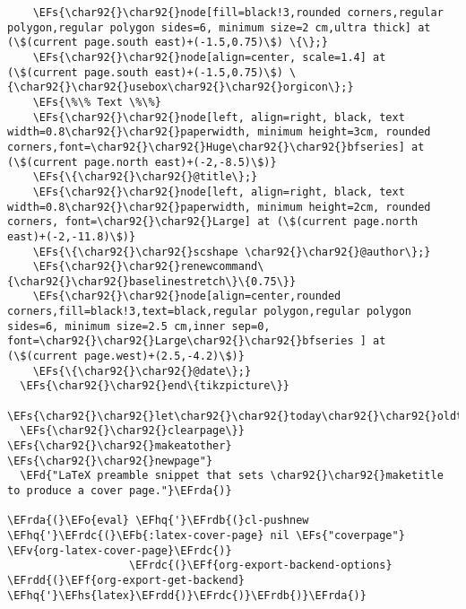 \documentclass{article}
\newcommand{\EFs}[1]{\textcolor{EFs}{#1}} %
\newcommand{\EFd}[1]{\textcolor{EFd}{#1}} %
\newcommand{\EFb}[1]{\textcolor{EFb}{#1}} %
\newcommand{\EFf}[1]{\textcolor{EFf}{#1}} %
\newcommand{\EFv}[1]{\textcolor{EFv}{#1}} %
\newcommand{\EFo}[1]{\textcolor{EFo}{#1}} %
\newcommand{\EFhq}[1]{#1} %
\newcommand{\EFhs}[1]{\textcolor{EFhs}{#1}} %
\newcommand{\EFrda}[1]{\textcolor{EFrda}{#1}} %
\newcommand{\EFrdb}[1]{\textcolor{EFrdb}{#1}} %
\newcommand{\EFrdc}[1]{\textcolor{EFrdc}{#1}} %
\newcommand{\EFrdd}[1]{\textcolor{EFrdd}{#1}} %
\begin{document}
\begin{Code}
\begin{Verbatim}
    \EFs{\char92{}\char92{}node[fill=black!3,rounded corners,regular polygon,regular polygon sides=6, minimum size=2 cm,ultra thick] at (\$(current page.south east)+(-1.5,0.75)\$) \{\};}
    \EFs{\char92{}\char92{}node[align=center, scale=1.4] at (\$(current page.south east)+(-1.5,0.75)\$) \{\char92{}\char92{}usebox\char92{}\char92{}orgicon\};}
    \EFs{\%\% Text \%\%}
    \EFs{\char92{}\char92{}node[left, align=right, black, text width=0.8\char92{}\char92{}paperwidth, minimum height=3cm, rounded corners,font=\char92{}\char92{}Huge\char92{}\char92{}bfseries] at (\$(current page.north east)+(-2,-8.5)\$)}
    \EFs{\{\char92{}\char92{}@title\};}
    \EFs{\char92{}\char92{}node[left, align=right, black, text width=0.8\char92{}\char92{}paperwidth, minimum height=2cm, rounded corners, font=\char92{}\char92{}Large] at (\$(current page.north east)+(-2,-11.8)\$)}
    \EFs{\{\char92{}\char92{}scshape \char92{}\char92{}@author\};}
    \EFs{\char92{}\char92{}renewcommand\{\char92{}\char92{}baselinestretch\}\{0.75\}}
    \EFs{\char92{}\char92{}node[align=center,rounded corners,fill=black!3,text=black,regular polygon,regular polygon sides=6, minimum size=2.5 cm,inner sep=0, font=\char92{}\char92{}Large\char92{}\char92{}bfseries ] at (\$(current page.west)+(2.5,-4.2)\$)}
    \EFs{\{\char92{}\char92{}@date\};}
  \EFs{\char92{}\char92{}end\{tikzpicture\}}
  \EFs{\char92{}\char92{}let\char92{}\char92{}today\char92{}\char92{}oldtoday}
  \EFs{\char92{}\char92{}clearpage\}}
\EFs{\char92{}\char92{}makeatother}
\EFs{\char92{}\char92{}newpage"}
  \EFd{"LaTeX preamble snippet that sets \char92{}\char92{}maketitle to produce a cover page."}\EFrda{)}

\EFrda{(}\EFo{eval} \EFhq{'}\EFrdb{(}cl-pushnew \EFhq{'}\EFrdc{(}\EFb{:latex-cover-page} nil \EFs{"coverpage"} \EFv{org-latex-cover-page}\EFrdc{)}
                   \EFrdc{(}\EFf{org-export-backend-options} \EFrdd{(}\EFf{org-export-get-backend} \EFhq{'}\EFhs{latex}\EFrdd{)}\EFrdc{)}\EFrdb{)}\EFrda{)}

\end{Verbatim}
\end{Code}
\end{document}
